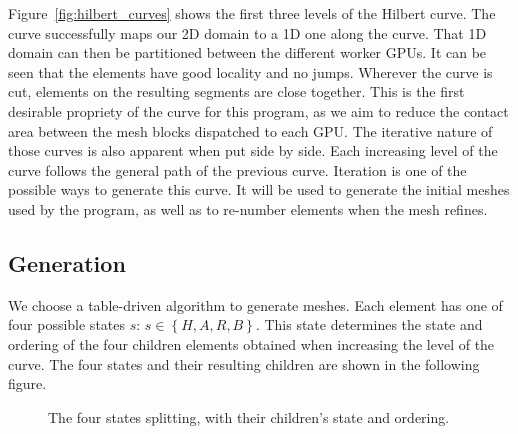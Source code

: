 Figure~\ref{fig:hilbert_curves} shows the first three levels of the Hilbert curve. The curve
successfully maps our 2D domain to a 1D one along the curve. That 1D domain can then be partitioned
between the different worker GPUs. It can be seen that the elements have good locality and no jumps. 
Wherever the curve is cut, elements on the resulting segments are close together. This is the first 
desirable propriety of the curve for this program, as we aim to reduce the contact area between 
the mesh blocks dispatched to each GPU. The iterative nature of those curves is also apparent when
put side by side. Each increasing level of the curve follows the general path of the previous curve.
Iteration is one of the possible ways to generate this curve. It will be used to generate the
initial meshes used by the program, as well as to re-number elements when the mesh refines.

\subsection{Generation} \label{section:load_balancing:hilbert_curve:generation}
We choose a table-driven algorithm to generate meshes. Each element has one of four possible states
$s$: $s \in \left \{H, A, R, B \right \}$. This state determines the state and ordering of the four children
elements obtained when increasing the level of the curve. The four states and their resulting
children are shown in the following figure.

\begin{figure}[H]
	\centering
	\hfill
	\hfill
	\hfill
	\caption{The four states splitting, with their children's state and ordering.}
	\label{fig:hilbert_splits}
\end{figure}

